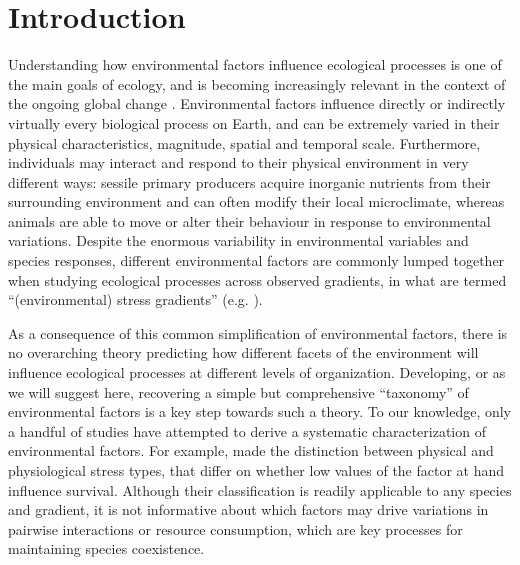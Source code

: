 \section{Introduction}

Understanding how environmental factors influence ecological processes is one of the main goals of ecology, and is becoming increasingly relevant in the context of the ongoing global change \citep{Vitousek1994}. Environmental factors influence directly or indirectly virtually every biological process on Earth, and can be extremely varied in their physical characteristics, magnitude, spatial and temporal scale. Furthermore, individuals may interact and respond to their physical environment in very different ways: sessile primary producers acquire inorganic nutrients from their surrounding environment and can often modify their local microclimate, whereas animals are able to move or alter their behaviour in response to environmental variations. Despite the enormous variability in environmental variables and species responses, different environmental factors are commonly lumped together when studying ecological processes across observed gradients, in what are termed “(environmental) stress gradients” (e.g. \citealt{Hart2013}).

As a consequence of this common simplification of environmental factors, there is no overarching theory predicting how different facets of the environment will influence ecological processes at different levels of organization. Developing, or as we will suggest here, recovering a simple but comprehensive “taxonomy” of environmental factors is a key step towards such a theory. To our knowledge, only a handful of studies have attempted to derive a systematic characterization of environmental factors. For example, \cite{Menge1987} made the distinction between physical and physiological stress types, that differ on whether low values of the factor at hand influence survival. Although their classification is readily applicable to any species and gradient, it is not informative about which factors may drive variations in pairwise interactions or resource consumption, which are key processes for maintaining species coexistence.

